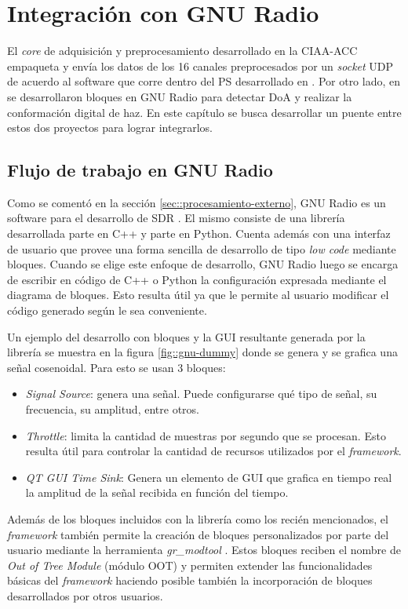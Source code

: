 \documentclass[../../main.tex]{subfiles}
\begin{document}
\graphicspath{{./figures}}
\chapter{Integración con GNU Radio}\label{cap::gnu-radio}
El \textit{core} de adquisición y preprocesamiento desarrollado en la CIAA-ACC empaqueta y envía los datos de los 16 canales preprocesados por un \textit{socket} UDP de acuerdo al software que corre dentro del PS desarrollado en \cite{proyecto-jose}. Por otro lado, en \cite{proyecto-grigo} se desarrollaron bloques en GNU Radio para detectar DoA y realizar la conformación digital de haz. En este capítulo se busca desarrollar un puente entre estos dos proyectos para lograr integrarlos.

\section{Flujo de trabajo en GNU Radio}
Como se comentó en la sección \ref{sec::procesamiento-externo}, GNU Radio es un software para el desarrollo de SDR \cite{GNURadio}. El mismo consiste de una librería desarrollada parte en C++ y parte en Python. Cuenta además con una interfaz de usuario que provee una forma sencilla de desarrollo de tipo \textit{low code} mediante bloques. Cuando se elige este enfoque de desarrollo, GNU Radio luego se encarga de escribir en código de C++ o Python la configuración expresada mediante el diagrama de bloques. Esto resulta útil ya que le permite al usuario modificar el código generado según le sea conveniente.

Un ejemplo del desarrollo con bloques y la GUI resultante generada por la librería se muestra en la figura \ref{fig::gnu-dummy} donde se genera  y se grafica una señal cosenoidal. Para esto se usan 3 bloques: 
\begin{itemize}
    \item \textit{Signal Source}: genera una señal. Puede configurarse qué tipo de señal, su frecuencia, su amplitud, entre otros.
    \item \textit{Throttle}: limita la cantidad de muestras por segundo que se procesan. Esto resulta útil para controlar la cantidad de recursos utilizados por el \textit{framework}.
    \item \textit{QT GUI Time Sink}: Genera un elemento de GUI que grafica en tiempo real la amplitud de la señal recibida en función del tiempo.
\end{itemize}

Además de los bloques incluidos con la librería como los recién mencionados, el \textit{framework} también permite la creación de bloques personalizados por parte del usuario mediante la herramienta \textit{gr\_modtool} \cite{gr-modtool}. Estos bloques reciben el nombre de \textit{Out of Tree Module} (módulo OOT) y permiten extender las funcionalidades básicas del \textit{framework} haciendo posible también la incorporación de bloques desarrollados por otros usuarios.
\end{document}
